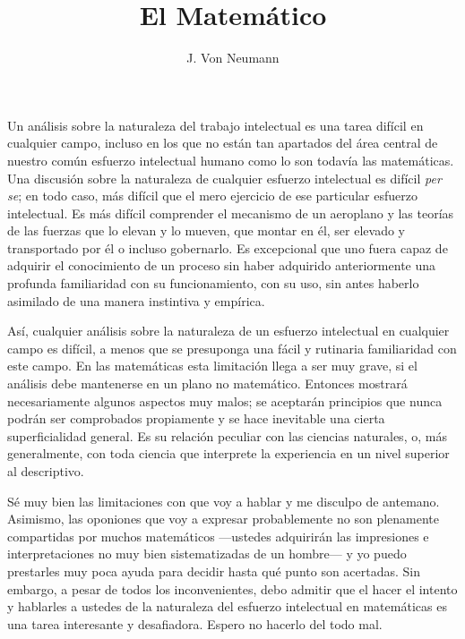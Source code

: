 \documentclass[a4paper, 12pt]{article}
\title{El Matemático}
\author{J. Von Neumann}
\date{}
\begin{document}
\begin{tcolorbox}[colback=blue!5!white,colframe=blue!75!black]

\vspace{-1.8cm}
\textbf \maketitle

\end{tcolorbox}

\bigskip

Un análisis sobre la naturaleza del trabajo intelectual es una tarea difícil en cualquier campo, incluso en los que no están tan apartados del área central de nuestro común esfuerzo intelectual humano como lo son todavía las matemáticas. Una discusión sobre la naturaleza de cualquier esfuerzo intelectual es difícil \textit{per se}; en todo caso, más difícil que el mero ejercicio de ese particular esfuerzo intelectual. Es más difícil comprender el mecanismo de un aeroplano y las teorías de las fuerzas que lo elevan y lo mueven, que montar en él, ser elevado y transportado por él o incluso gobernarlo. Es excepcional que uno fuera capaz de adquirir el conocimiento de un proceso sin haber adquirido anteriormente una profunda familiaridad con su funcionamiento, con su uso, sin antes haberlo asimilado de una manera instintiva y empírica.

Así, cualquier análisis sobre la naturaleza de un esfuerzo intelectual en cualquier campo es difícil, a menos que se presuponga una fácil y rutinaria familiaridad con este campo. En las matemáticas esta limitación llega a ser muy grave, si el análisis debe mantenerse en un plano no matemático. Entonces mostrará necesariamente algunos aspectos muy malos; se aceptarán principios que nunca podrán ser comprobados propiamente y se hace inevitable una cierta superficialidad general. Es su relación peculiar con las ciencias naturales, o, más generalmente, con toda ciencia que interprete la experiencia en un nivel superior al descriptivo.

Sé muy bien las limitaciones con que voy a hablar y me disculpo de antemano. Asimismo, las oponiones que voy a expresar probablemente no son plenamente compartidas por muchos matemáticos ---ustedes adquirirán las impresiones 
e interpretaciones no muy bien sistematizadas de un hombre--- y yo puedo prestarles muy poca ayuda para decidir hasta qué punto son acertadas.
Sin embargo, a pesar de todos los inconvenientes, debo admitir que el hacer el intento y hablarles a ustedes de la naturaleza del esfuerzo intelectual en matemáticas es una tarea interesante y desafiadora. Espero no hacerlo del todo mal.
\end{document}
